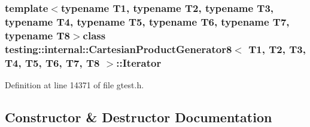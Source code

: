 \subsubsection*{template$<$typename T1, typename T2, typename T3, typename T4, typename T5, typename T6, typename T7, typename T8$>$class testing\-::internal\-::\-Cartesian\-Product\-Generator8$<$ T1, T2, T3, T4, T5, T6, T7, T8 $>$\-::\-Iterator}



\-Definition at line 14371 of file gtest.\-h.



\subsection{\-Constructor \& \-Destructor \-Documentation}
\hypertarget{classtesting_1_1internal_1_1CartesianProductGenerator8_1_1Iterator_ab9ec04d7e23de34d28db54a3494e1cee}{
}
